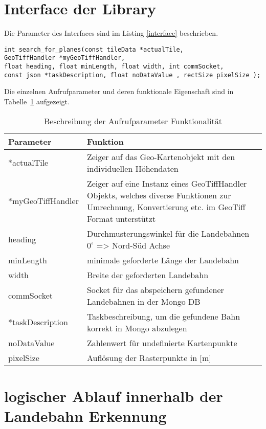 \documentclass[10pt,a4paper]{report}
\begin{document}
\section{Interface der Library}

Die Parameter des Interfaces sind im Listing \ref{interface} beschrieben.

\begin{lstlisting}[caption=Interface Beschreibung, label=interface]
int search_for_planes(const tileData *actualTile, 
GeoTiffHandler *myGeoTiffHandler, 
float heading, float minLength, float width, int commSocket,
const json *taskDescription, float noDataValue , rectSize pixelSize );
\end{lstlisting}

Die einzelnen Aufrufparameter und deren funktionale Eigenschaft sind in Tabelle~\ref{beschreibungparameter} aufgezeigt.

\begin{table}[htb]
\centering
\begin{tabular}{|p{4.5cm}|p{10cm}|}
\hline 
\bf{Parameter} & \bf{Funktion} \\ 
\hline 
*actualTile & Zeiger auf das Geo-Kartenobjekt mit den individuellen Höhendaten \\ 
\hline 
*myGeoTiffHandler & Zeiger auf eine Instanz eines GeoTiffHandler Objekts, 
welches diverse Funktionen zur Umrechnung, Konvertierung etc. im GeoTiff Format unterstützt \\ 
\hline 
heading & Durchmusterungswinkel für die Landebahnen $0^\circ$ => Nord-Süd Achse \\ 
\hline 
minLength & minimale geforderte Länge der Landebahn \\ 
\hline 
width & Breite der geforderten Landebahn \\ 
\hline 
commSocket & Socket für das abspeichern gefundener Landebahnen in der Mongo DB\\ 
\hline 
*taskDescription & Taskbeschreibung, um die gefundene Bahn korrekt in Mongo abzulegen \\ 
\hline 
noDataValue & Zahlenwert für undefinierte Kartenpunkte \\ 
\hline 
pixelSize & Auflösung der Rasterpunkte in [m]\\
\hline 

\end{tabular} 
\caption{Beschreibung der Aufrufparameter Funktionalität}\label{beschreibungparameter}
\end{table}

\section{logischer Ablauf innerhalb der Landebahn Erkennung}
\end{document}
